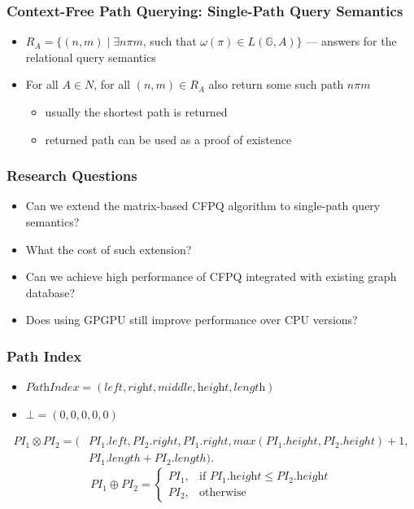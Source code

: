 \documentclass[xcolor=table]{beamer}
\begin{document}
\begin{frame}[fragile]
\frametitle{Context-Free Path Querying: Single-Path Query Semantics}
\begin{itemize}
	\item $R_A = \{ (n, m) \mid \exists n \pi m$, such that $\omega(\pi) \in L(\mathbb{G},A)\}$ --- answers for the relational query semantics
	\pause
	\item For all $A \in N$, for all $(n,m) \in R_A$ also return some such path $n\pi m$
	\begin{itemize}
		\item usually the shortest path is returned
		\item returned path can be used as a proof of existence
	\end{itemize}
	
\end{itemize}
\end{frame}

\begin{frame}[fragile] \frametitle{Research Questions}
\begin{itemize}
	\item Can we extend the matrix-based CFPQ algorithm to single-path query semantics?
	\item What the cost of such extension?
	\item Can we achieve high performance of CFPQ integrated with existing graph database?
	\item Does using GPGPU still improve performance over CPU versions?
\end{itemize}
\end{frame}

\begin{frame}[fragile] \frametitle{Path Index}
\begin{itemize}
	\item $\textit{PathIndex} = (\textit{left},\textit{right},\textit{middle},\textit{height},\textit{length})$
	\pause
	\item $\bot = (0, 0, 0, 0, 0)$
\end{itemize}
\pause
\begin{align*}
PI_1 \otimes PI_2 = (&PI_1.left, PI_2.right, PI_1.right,
max(PI_1.height, PI_2.height)+1,\\
&PI_1.length + PI_2.length).
\end{align*}
\pause
$$PI_1 \oplus PI_2 = \begin{cases} PI_1, & \mbox{if } PI_1.\textit{height} \leq PI_2.\textit{height} \\ PI_2, & \mbox{otherwise} \end{cases}$$
\end{frame}
\end{document}
